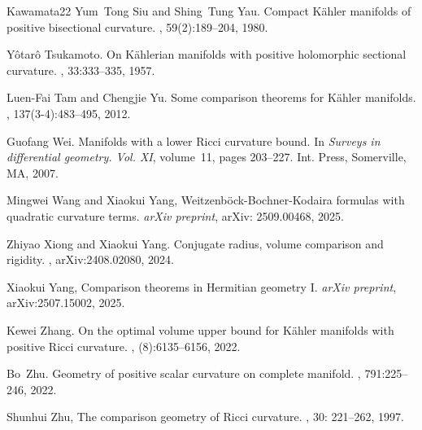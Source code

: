 \documentclass[12pt,reqno]{amsart}
\theoremstyle{plain}
\theoremstyle{definition}
\renewcommand{\>}{\rightarrow}
\numberwithin{equation}{section} %
\begin{document}
\begin{thebibliography}{Kawamata22}
    Yum~Tong Siu and Shing~Tung Yau.
    \newblock Compact {K}\"ahler manifolds of positive bisectional curvature.
    , 59(2):189--204, 1980.

    Y\^otar\^o Tsukamoto.
    \newblock On {K}\"ahlerian manifolds with positive holomorphic sectional curvature.
    , 33:333--335, 1957.

    Luen-Fai Tam and Chengjie Yu.
    \newblock Some comparison theorems for {K}\"ahler manifolds.
    , 137(3-4):483--495, 2012.


    Guofang Wei.
    \newblock Manifolds with a lower {R}icci curvature bound.
    \newblock In {\em Surveys in differential geometry. {V}ol. {XI}}, volume~11, pages 203--227. Int. Press, Somerville, MA, 2007.

    Mingwei Wang and Xiaokui Yang, Weitzenb\"ock-Bochner-Kodaira formulas with quadratic curvature terms. {\em arXiv preprint}, arXiv: 2509.00468, 2025.


    Zhiyao Xiong and Xiaokui Yang.
    \newblock Conjugate radius, volume comparison and rigidity.
    , arXiv:2408.02080, 2024.









     Xiaokui Yang, Comparison theorems in Hermitian geometry I. {\em arXiv preprint}, arXiv:2507.15002, 2025.







    Kewei Zhang.
    \newblock On the optimal volume upper bound for {K}\"ahler manifolds with positive {R}icci curvature.
    , (8):6135--6156, 2022.



    Bo~Zhu.
    \newblock Geometry of positive scalar curvature on complete manifold.
    , 791:225--246, 2022.

    Shunhui Zhu,
    \newblock The comparison geometry of Ricci curvature.
    , 30: 221--262, 1997.




\end{thebibliography}
\end{document}
